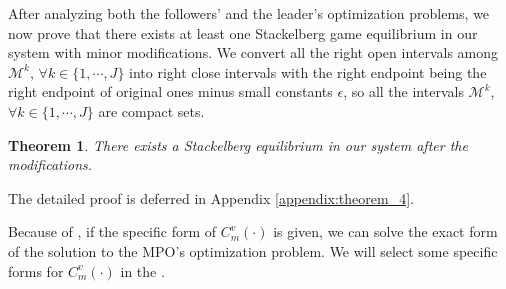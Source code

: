 \documentclass[10pt,journal, compsoc]{IEEEtran}
\newtheorem{theorem}{Theorem}
\begin{document}
After analyzing both the followers' and the leader's optimization problems, we now prove that there exists at least one Stackelberg game equilibrium in our system with minor modifications. We convert all the right open intervals among $\mathcal{M}^k$, $\forall k \in \{1, \cdots, J\}$ into right close intervals with the right endpoint being the right endpoint of original ones minus small constants $\epsilon$, so all the intervals $\mathcal{M}^k$, $\forall k \in \{1, \cdots, J\}$ are compact sets. 
\begin{theorem} \label{thm:stackelberg_game_equilibrium}
There exists a Stackelberg equilibrium in our system after the modifications.
\end{theorem}
The detailed proof is deferred in Appendix \ref{appendix:theorem_4}.

Because of , if the specific form of $C_m^v(\cdot)$ is given, we can solve the exact form of the solution to the MPO's optimization problem. We will select some specific forms for $C_m^v(\cdot)$ in the .
\end{document}
